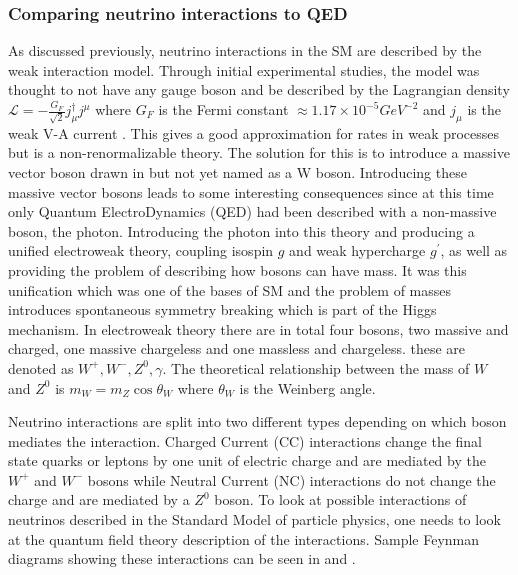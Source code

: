 \pagebreak

\subsubsection{Comparing neutrino interactions to QED}
As discussed previously, neutrino interactions in the SM are described by the weak interaction model. Through initial experimental studies, the model was thought to not have any gauge boson and be described by the Lagrangian density $\mathscr{L} = -\frac{G_F}{\sqrt{2}} j_\mu ^\dagger j^\mu$ where $G_F$ is the Fermi constant $\approx 1.17 \times 10^{-5} GeV^{-2}$ and $j_\mu$ is the weak V-A current \cite{47Soler}. This gives a good approximation for rates in weak processes but is a non-renormalizable theory. The solution for this is to introduce a massive vector boson drawn in  but not yet named as a W boson. Introducing these massive vector bosons leads to some interesting consequences since at this time only Quantum ElectroDynamics (QED) had been described with a non-massive boson, the photon. Introducing the photon into this theory and producing a unified electroweak theory, coupling isospin $g$ and weak hypercharge $g^\prime$, as well as providing the problem of describing how bosons can have mass. It was this unification which was one of the bases of SM and the problem of masses introduces spontaneous symmetry breaking which is part of the Higgs mechanism. In electroweak theory there are in total four bosons, two massive and charged, one massive chargeless and one massless and chargeless. these are denoted as $W^+, W^-, Z^0, \gamma$. The theoretical relationship between the mass of $W$ and $Z^0$ is $m_W = m_Z \cos \theta_W$ where $\theta_W$ is the Weinberg angle.

Neutrino interactions are split into two different types depending on which boson mediates the interaction.
Charged Current (CC) interactions change the final state quarks or leptons by one unit of electric charge and are mediated by the $W^+$ and $W^-$ bosons while Neutral Current (NC) interactions do not change the charge and are mediated by a $Z^0$ boson. 
To look at possible interactions of neutrinos described in the Standard Model of particle physics, one needs to look at the quantum field theory description of the interactions\cite{3Peskin, 2Hallsjo}. Sample Feynman diagrams showing these interactions can be seen in  and .

